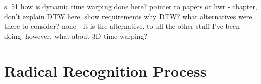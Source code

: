 s. 51
how is dynamic time warping done here?
pointer to papers or hwr - chapter, don't explain DTW here.
show requirements
why DTW?
what alternatives were there to consider?
none - it is the alternative.
to all the other stuff I've been doing.
however, what about 3D time warping?


\section{Radical Recognition Process}
\label{sec:hwre:radicalrecognitionprocess}






    


